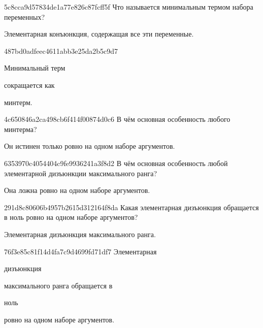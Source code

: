 \begin{note}{5c8cca9d57834de1a77e826c87fcff5f}
    Что называется минимальным термом набора переменных?

    \begin{cloze}{1}
        Элементарная конъюнкция, содержащая все эти переменные.
    \end{cloze}
\end{note}

\begin{note}{487bd0adfeec4611abb3e25da2b5c9d7}
    \begin{icloze}{2}Минимальный терм\end{icloze} сокращается как \begin{icloze}{1}минтерм.\end{icloze}
\end{note}

\begin{note}{4c650846a2ca498cb6f414f00874d0c6}
    В чём основная особенность любого минтерма?

    \begin{cloze}{1}
        Он истинен только ровно на одном наборе аргументов.
    \end{cloze}
\end{note}

\begin{note}{6353970c4054404c9fe9936241a3f8d2}
    В чём основная особенность любой элементарной дизъюнкции максимального ранга?

    \begin{cloze}{1}
        Она ложна ровно на одном наборе аргументов.
    \end{cloze}
\end{note}

\begin{note}{291d8c80606b4957b2615d312164f8da}
    Какая элементарная дизъюнкция обращается в ноль ровно на одном наборе аргументов?

    \begin{cloze}{1}
        Элементарная дизъюнкция максимального ранга.
    \end{cloze}
\end{note}

\begin{note}{76f3e85c81f14d4fa7c9d4699fd71df7}
    Элементарная \begin{icloze}{1}дизъюнкция\end{icloze} максимального ранга обращается в \begin{icloze}{2}ноль\end{icloze} ровно на одном наборе аргументов.
\end{note}

